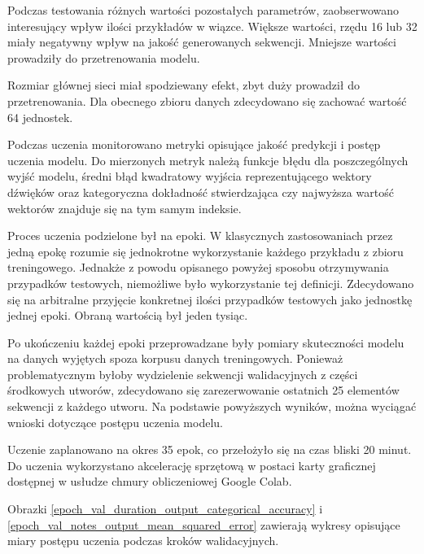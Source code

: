 {{        \bigskip

        Podczas testowania różnych wartości pozostałych parametrów, zaobserwowano interesujący wpływ ilości przykładów w wiązce.
        Większe wartości, rzędu 16 lub 32 miały negatywny wpływ na jakość generowanych sekwencji. 
        Mniejsze wartości prowadziły do przetrenowania modelu.

        Rozmiar głównej sieci miał spodziewany efekt, zbyt duży prowadził do przetrenowania. Dla obecnego
        zbioru danych zdecydowano się zachować wartość 64 jednostek.

        \bigskip

        Podczas uczenia monitorowano metryki opisujące jakość predykcji i postęp uczenia modelu.
        Do mierzonych metryk należą funkcje błędu dla poszczególnych wyjść modelu, średni błąd kwadratowy
        wyjścia reprezentującego wektory dźwięków oraz kategoryczna dokładność stwierdzająca czy najwyższa wartość
        wektorów znajduje się na tym samym indeksie.
        
        Proces uczenia podzielone był na epoki. W klasycznych zastosowaniach przez jedną epokę rozumie się jednokrotne
        wykorzystanie każdego przykładu z zbioru treningowego. Jednakże z powodu opisanego powyżej sposobu otrzymywania
        przypadków testowych, niemożliwe było wykorzystanie tej definicji. Zdecydowano się na arbitralne przyjęcie konkretnej 
        ilości przypadków testowych jako jednostkę jednej epoki. Obraną wartością był jeden tysiąc.

        Po ukończeniu każdej epoki przeprowadzane były pomiary skuteczności modelu na danych wyjętych spoza korpusu 
        danych treningowych. Ponieważ problematycznym byłoby wydzielenie sekwencji walidacyjnych z części środkowych
        utworów, zdecydowano się zarezerwowanie ostatnich 25 elementów sekwencji z każdego utworu.
        Na podstawie powyższych wyników, można wyciągać wnioski dotyczące postępu uczenia modelu.

        Uczenie zaplanowano na okres 35 epok, co przełożyło się na czas bliski 20 minut. Do uczenia wykorzystano
        akcelerację sprzętową w postaci karty graficznej dostępnej w usłudze chmury obliczeniowej Google Colab.

        Obrazki \ref{epoch_val_duration_output_categorical_accuracy} i \ref{epoch_val_notes_output_mean_squared_error} zawierają wykresy opisujące miary postępu uczenia podczas kroków walidacyjnych.

}}
